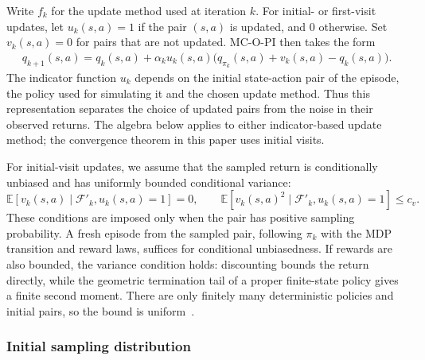 \documentclass[twoside,11pt]{article}
\DeclareRobustCommand{\reviewbarstart}{%
  \ifhmode %
    \vadjust{\vbox to 0pt{%
      \vskip-\ht\strutbox %
      \vskip-\dp\strutbox %
      \cbstart[\changebarwidth] %
      \vss %
    }}%
  \else %
    \cbstart[\changebarwidth]%
  \fi %
} %
\providecommand{\DIFadd}[1]{#1} %
\providecommand{\DIFaddbegin}{\reviewbarstart} %
\providecommand{\DIFaddend}{\protect\cbend} %
\def\DIFadd#1{#1}%
\def\DIFaddbegin{}%
\def\DIFaddend{}%
\begin{document}
 \DIFaddbegin \DIFadd{Write $f_k$ for the update method used at iteration $k$.
For }\DIFaddend initial-  or first-visit  updates,  \DIFaddbegin \DIFadd{let }\DIFaddend $u_k(s,a)=1$ if  \DIFaddbegin \DIFadd{the pair $(s,a)$ is }\DIFaddend updated, and  \DIFaddbegin \DIFadd{$0$ otherwise. Set $v_k(s,a)=0$ for pairs that are not updated.
MC-O-PI then takes the form
}\begin{align}
\DIFadd{\label{eq: update q with chi}
q_{k+1}(s,a)
= q_k(s,a)+\alpha_k u_k(s,a)\big(q_{\pi_k}(s,a)+v_k(s,a)-q_k(s,a)\big).
}\end{align}
\DIFaddend The indicator function $u_k$ depends on the initial state-action pair of the  episode, the policy used for simulating it and the chosen update  \DIFaddbegin \DIFadd{method.
Thus this representation separates the choice of updated pairs from the noise in their observed returns. The algebra below applies to either indicator-based update method; the convergence theorem in this paper uses initial visits.
}

\DIFadd{For initial-visit updates, we assume that the sampled return is conditionally unbiased and has uniformly bounded conditional variance:
}\begin{equation}
\DIFadd{\label{eq: return moments}
\mathbb E}[\DIFadd{v_k(s,a)\mid\mathcal F'_k,u_k(s,a)=1}]\DIFadd{=0,
\qquad
\mathbb E}[\DIFadd{v_k(s,a)^2\mid\mathcal F'_k,u_k(s,a)=1}]\DIFadd{\le c_v.
}\end{equation}
\DIFadd{These conditions are imposed only when the pair has positive sampling probability. A fresh episode from the sampled pair, following $\pi_k$ with the MDP transition and reward laws, suffices for conditional unbiasedness. If rewards are also bounded, the variance condition holds: discounting bounds the return directly, while the geometric termination tail of a proper finite-state policy gives a finite second moment. There are only finitely many deterministic policies and initial pairs, so the bound is uniform~\citep[Section~2.2.1]{Bertsekas1996Neuro-DynamicProgramming}}\DIFaddend .

\subsubsection{Initial sampling distribution}
\end{document}
